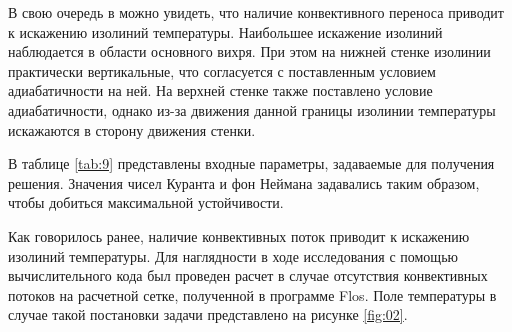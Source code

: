 В свою очередь в можно увидеть, что наличие конвективного
переноса приводит к искажению изолиний температуры. Наибольшее
искажение изолиний наблюдается в области основного вихря. При этом на
нижней стенке изолинии практически вертикальные, что согласуется с
поставленным условием адиабатичности на ней. На верхней стенке также
поставлено условие адиабатичности, однако из-за движения данной границы
изолинии температуры искажаются в сторону движения стенки.

В таблице \ref{tab:9} представлены входные параметры, задаваемые для получения решения. Значения чисел Куранта и фон Неймана задавались таким образом, чтобы добиться максимальной устойчивости.



\begin{table}[H]
    \centering
    \caption{Входные параметры}

    \label{tab:9}
\end{table}
Как говорилось ранее, наличие конвективных поток приводит к
искажению изолиний температуры. Для наглядности в ходе исследования с
помощью вычислительного кода был проведен расчет в случае отсутствия
конвективных потоков на расчетной сетке, полученной в программе Flos. Поле
температуры в случае такой постановки задачи представлено на рисунке \ref{fig:02}.

